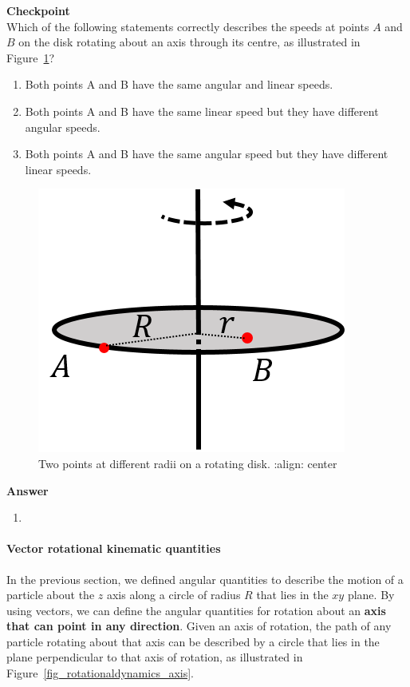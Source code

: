 \begin{framed}
\textbf{Checkpoint}\\
Which of the following statements correctly describes the speeds at points $A$ and $B$ on the disk rotating about an axis through its centre, as illustrated in Figure~\ref{fig_rotationaldynamics_rotatingdisk}?

\begin{enumerate}
\item Both points A and B have the same angular and linear speeds.
\item Both points A and B have the same linear speed but they have different angular speeds.
\item Both points A and B have the same angular speed but they have different linear speeds.
\end{enumerate}

\begin{figure}[!htbp]
\centering
\includegraphics[width=0.375\linewidth]{files/rotatingdisk-fb0502378e225f6c9e0e3f469178fbe1.png}
\caption[]{Two points at different radii on a rotating disk.
:align: center}
\label{fig_rotationaldynamics_rotatingdisk}
\end{figure}

\begin{framed}
\textbf{Answer}\\
\begin{enumerate}[resume]
\item
\end{enumerate}
\end{framed}
\end{framed}

\paragraph{Vector rotational kinematic quantities}

In the previous section, we defined angular quantities to describe the motion of a particle about the $z$ axis along a circle of radius $R$ that lies in the $xy$ plane. By using vectors, we can define the angular quantities for rotation about an \textbf{axis that can point in any direction}. Given an axis of rotation, the path of any particle rotating about that axis can be described by a circle that lies in the plane perpendicular to that axis of rotation, as illustrated in Figure~\ref{fig_rotationaldynamics_axis}.

